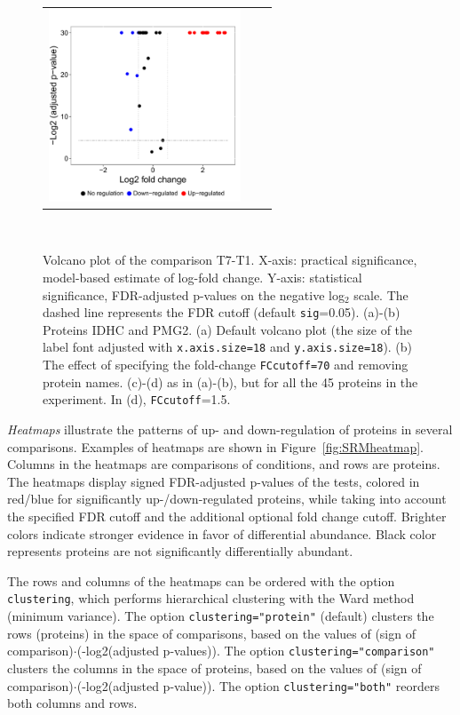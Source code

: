 \documentclass[11pt]{article}
\def\figref#1{Figure~\ref{fig:#1}}
\begin{document}
\begin{figure}[h!]
\begin{center}
\begin{tabular}{ccc}
\includegraphics[width=2.25in]{Volcano45Yeast2.pdf}
\end{tabular}\\
\vspace{-0.3cm}
\caption{\small Volcano plot of the comparison T7-T1. X-axis: practical significance, model-based estimate of log-fold change. Y-axis: statistical significance, FDR-adjusted p-values on the negative log$_2$ scale. The dashed line represents the FDR cutoff (default {\tt sig}=0.05). (a)-(b) Proteins IDHC and PMG2. (a) Default volcano plot (the size of the label font adjusted with {\tt x.axis.size=18} and {\tt y.axis.size=18}). (b) The effect of specifying the fold-change {\tt FCcutoff=70} and removing protein names. (c)-(d) as in (a)-(b), but for all the 45 proteins in the experiment. In (d), {\tt FCcutoff}=1.5. \label{fig:SRMvolcano}}
\end{center}
\end{figure}


\clearpage
{\it Heatmaps} illustrate the patterns of up- and down-regulation of proteins in several comparisons. Examples of heatmaps are shown in \figref{SRMheatmap}. Columns in the heatmaps are comparisons of conditions, and rows are proteins. The heatmaps display signed FDR-adjusted p-values of the tests, colored in red/blue for significantly up-/down-regulated proteins, while taking into account the specified FDR cutoff and the additional optional fold change cutoff. Brighter colors indicate stronger evidence in favor of differential abundance. Black color represents proteins are not significantly differentially abundant.

The rows and columns of the heatmaps can be ordered with the option {\tt clustering}, which performs hierarchical clustering with the Ward method (minimum variance). The option {\tt clustering="protein"} (default) clusters the rows (proteins) in the space of comparisons, based on the values of (sign of comparison)$\cdot$(-log2(adjusted p-values)). The option {\tt clustering="comparison"} clusters the columns in the space of proteins, based on the values of (sign of comparison)$\cdot$(-log2(adjusted p-value)). The option {\tt clustering="both"} reorders both columns and rows.
\end{document}
